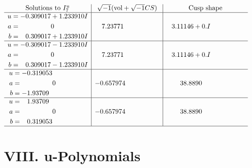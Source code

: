 \documentclass[1p]{elsarticle_modified}
\theoremstyle{definition}
\newcommand{\I}{\sqrt{-1}}
\begin{document}
$$\begin{array}{c|c|c}  
\text{Solutions to }I^u_{7}& \I (\text{vol} + \sqrt{-1}CS) & \text{Cusp shape}\\
 \hline 
\begin{aligned}
u &= -0.309017 + 1.233910 I \\
a &= \phantom{-0.000000 } 0 \\
b &= \phantom{-}0.309017 + 1.233910 I\end{aligned}
 & \phantom{-}7.23771\phantom{ +0.000000I} & \phantom{-}3.11146 + 0. I\phantom{ +0.000000I} \\ \hline\begin{aligned}
u &= -0.309017 - 1.233910 I \\
a &= \phantom{-0.000000 } 0 \\
b &= \phantom{-}0.309017 - 1.233910 I\end{aligned}
 & \phantom{-}7.23771\phantom{ +0.000000I} & \phantom{-}3.11146 + 0. I\phantom{ +0.000000I} \\ \hline\begin{aligned}
u &= -0.319053\phantom{ +0.000000I} \\
a &= \phantom{-0.000000 } 0 \\
b &= -1.93709\phantom{ +0.000000I}\end{aligned}
 & -0.657974\phantom{ +0.000000I} & \phantom{-}38.8890\phantom{ +0.000000I} \\ \hline\begin{aligned}
u &= \phantom{-}1.93709\phantom{ +0.000000I} \\
a &= \phantom{-0.000000 } 0 \\
b &= \phantom{-}0.319053\phantom{ +0.000000I}\end{aligned}
 & -0.657974\phantom{ +0.000000I} & \phantom{-}38.8890\phantom{ +0.000000I}\\
 \hline 
 \end{array}$$\newpage
\newpage\renewcommand{\arraystretch}{1}
\centering \section*{ VIII. u-Polynomials}
\end{document}
